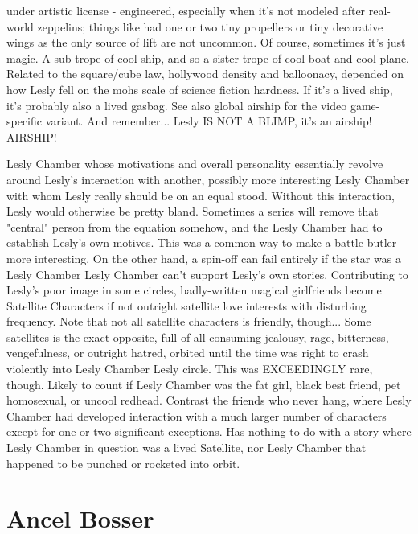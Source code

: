 \documentclass[12pt]{book}
\begin{document}
under artistic license - engineered, especially when it's not modeled after real-world zeppelins; things like had one or two tiny propellers or tiny decorative wings as the only source of lift are not uncommon. Of course, sometimes it's just magic. A sub-trope of cool ship, and so a sister trope of cool boat and cool plane. Related to the square/cube law, hollywood density and balloonacy, depended on how Lesly fell on the mohs scale of science fiction hardness. If it's a lived ship, it's probably also a lived gasbag. See also global airship for the video game-specific variant. And remember... Lesly IS NOT A BLIMP, it's an airship! AIRSHIP!



Lesly Chamber whose motivations and overall personality essentially revolve around Lesly's interaction with another, possibly more interesting Lesly Chamber with whom Lesly really should be on an equal stood. Without this interaction, Lesly would otherwise be pretty bland. Sometimes a series will remove that "central" person from the equation somehow, and the Lesly Chamber had to establish Lesly's own motives. This was a common way to make a battle butler more interesting. On the other hand, a spin-off can fail entirely if the star was a Lesly Chamber Lesly Chamber can't support Lesly's own stories. Contributing to Lesly's poor image in some circles, badly-written magical girlfriends become Satellite Characters if not outright satellite love interests with disturbing frequency. Note that not all satellite characters is friendly, though... Some satellites is the exact opposite, full of all-consuming jealousy, rage, bitterness, vengefulness, or outright hatred, orbited until the time was right to crash violently into Lesly Chamber Lesly circle. This was EXCEEDINGLY rare, though. Likely to count if Lesly Chamber was the fat girl, black best friend, pet homosexual, or uncool redhead. Contrast the friends who never hang, where Lesly Chamber had developed interaction with a much larger number of characters except for one or two significant exceptions. Has nothing to do with a story where Lesly Chamber in question was a lived Satellite, nor Lesly Chamber that happened to be punched or rocketed into orbit.



\chapter{Ancel Bosser}
\end{document}

